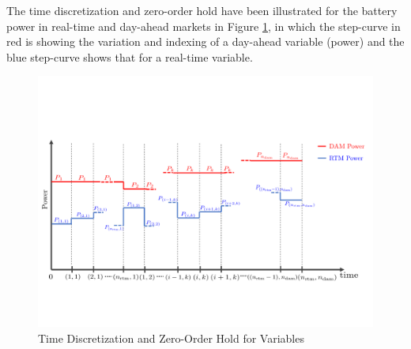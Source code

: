 \documentclass[11pt,twoside]{article}
\begin{document}
The time discretization and zero-order hold have been illustrated for the battery power in real-time and day-ahead markets in Figure \ref{fig:discretization}, in which the step-curve in red is showing the variation and indexing of a day-ahead variable (power) and the blue step-curve shows that for a real-time variable.
\begin{figure}[h!]
\begin{center}
\includegraphics[scale=0.5]{Figures/discretization1.pdf} \caption{Time Discretization and Zero-Order Hold for Variables}\label{fig:discretization}\end{center}
\end{figure}
\FloatBarrier
\end{document}
